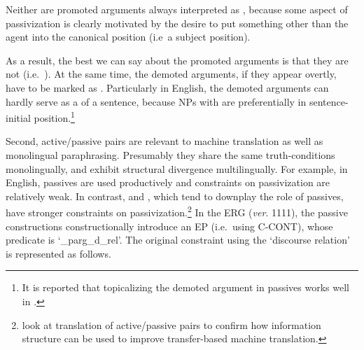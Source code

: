 
 
\noindent Neither are promoted arguments always interpreted as
, because some aspect of passivization is clearly motivated
by the desire to put something other than the agent into the canonical
 position (i.e\ a subject position).



\noindent As a result, the best we can say about the promoted
arguments is that they are not 
(i.e.\ ). At the same time, the demoted arguments,
if they appear overtly, have to be marked as
. Particularly in English, the demoted arguments can
hardly serve as a  of a sentence, because NPs with
 are preferentially in sentence-initial
position.\footnote{It is reported that topicalizing the demoted
  argument in passives works well in .}


Second, active/passive pairs are relevant to machine translation as
well as monolingual paraphrasing. Presumably they share the same
truth-conditions monolingually, and exhibit
structural divergence multilingually. For example, in English,
passives are used productively and constraints on passivization are
relatively weak. In contrast,  and , which
tend to downplay the role of passives, have stronger
constraints on passivization.\footnote{\citet{song:bender:11} look at
  translation of active/passive pairs to confirm how information
  structure can be used to improve transfer-based machine
  translation.} In the ERG (\textit{ver}. 1111), the passive
constructions constructionally introduce an EP (i.e.\ using C-CONT),
whose predicate is `\_parg\_d\_rel'.  The original constraint using
the `discourse relation' is represented as follows.




